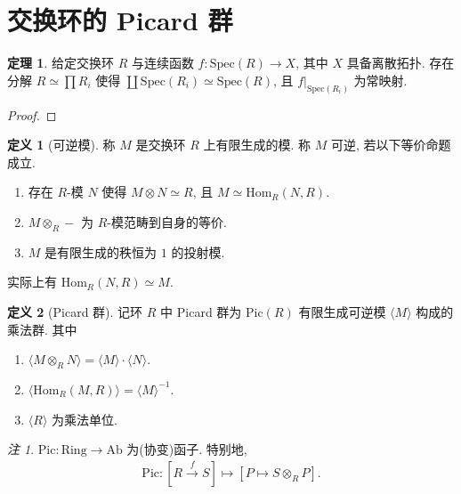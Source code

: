 \documentclass{MainStyle}
\theoremstyle{definition}
\theoremstyle{definition}
\theoremstyle{definition}
\newtheorem{definition}{定义}
\theoremstyle{definition}
\theoremstyle{definition}
\theoremstyle{definition}
\theoremstyle{definition}
\newtheorem{theorem}{定理}
\theoremstyle{remark}
\newtheorem{remark}{注}
\theoremstyle{remark}
\begin{document}
\maketitle

\section{交换环的 Picard 群}

\begin{theorem}
    给定交换环 $R$ 与连续函数 $f:\mathrm{Spec}(R)\to X$, 其中 $X$ 具备离散拓扑. 存在分解 $R\simeq \prod R_i$ 使得 $\coprod\mathrm{Spec}(R_i)\simeq \mathrm{Spec}(R)$, 且 $f|_{\mathrm{Spec}(R_i)}$ 为常映射.
    \begin{proof}

    \end{proof}
\end{theorem}

\begin{definition}[可逆模]
    称 $M$ 是交换环 $R$ 上有限生成的模. 称 $M$ 可逆, 若以下等价命题成立.
    \begin{enumerate}
        \item 存在 $R$-模 $N$ 使得 $M\otimes N\simeq R$, 且 $M\simeq \mathrm{Hom}_R(N,R)$.
        \item $M\otimes_R-$ 为 $R$-模范畴到自身的等价.
        \item $M$ 是有限生成的秩恒为 $1$ 的投射模.
    \end{enumerate}
    实际上有 $\mathrm{Hom}_R(N,R)\simeq M$.
\end{definition}

\begin{definition}[Picard 群]
    记环 $R$ 中 Picard 群为 $\mathrm{Pic}(R)$ 有限生成可逆模 $\langle M\rangle$ 构成的乘法群. 其中
    \begin{enumerate}
        \item $\langle M\otimes_R N\rangle=\langle M\rangle\cdot \langle  N\rangle$.
        \item $\langle \mathrm{Hom}_R(M,R)\rangle=\langle M\rangle^{-1}$.
        \item $\langle R\rangle$ 为乘法单位.
    \end{enumerate}
\end{definition}

\begin{remark}
    $\mathrm{Pic}:\mathrm{Ring}\to \mathrm{Ab}$ 为(协变)函子. 特别地,
    \begin{align*}
        \mathrm{Pic}:\left[R\overset f\longrightarrow S\right]\mapsto [P\mapsto S\otimes_R P].
    \end{align*}
\end{remark}
\end{document}
